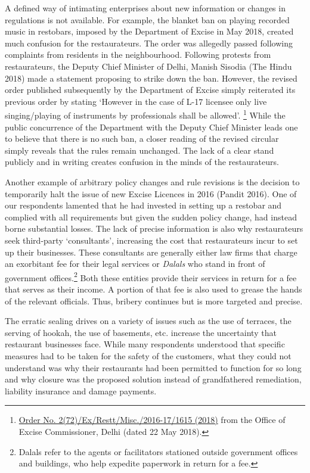 \documentclass[a4paper, 12pt]{article}
\begin{document}
		A defined way of intimating enterprises about new information or changes in regulations is not available. For example, the blanket ban on playing recorded music in restobars, imposed by the Department of Excise in May 2018, created much confusion 
for the restaurateurs. The order was allegedly passed following complaints from residents in the neighbourhood. Following protests from restaurateurs, the Deputy Chief Minister of Delhi, Manish Sisodia (The Hindu 2018) made a statement proposing to strike down 
the ban. However, the revised order published subsequently by the Department of Excise simply reiterated its previous order by stating ‘However in the case of L-17 licensee only live singing/playing of instruments by professionals shall be allowed’.
\footnote{\href{https://bit.ly/2QxMK56}{Order No. 2(72)/Ex/Restt/Misc./2016-17/1615 (2018)} from the Office of Excise Commissioner, Delhi (dated 22 May 2018).}  While the public concurrence of the Department with the Deputy Chief Minister leads one to believe 
that there is no such ban, a closer reading of the revised circular simply reveals that the rules remain unchanged. The lack of a clear stand publicly and in writing creates confusion in the minds of the restaurateurs.
		
		Another example of arbitrary policy changes and rule revisions is the decision to temporarily halt the issue of new Excise Licences in 2016 (Pandit 2016). One of our respondents lamented that he had invested in setting up a restobar and complied with 
all requirements but given the sudden policy change, had instead borne substantial losses. The lack of precise information is also why restaurateurs seek third-party ‘consultants’, increasing the cost that restaurateurs incur to set up their businesses. These 
consultants are generally either law firms that charge an exorbitant fee for their legal services or \textit{Dalals} who stand in front of government offices.\footnote{Dalals refer to the agents or facilitators stationed outside government offices and buildings, who help 
expedite paperwork in return for a fee.} Both these entities provide their services in return for a fee that serves as their income. A portion of that fee is also used to grease the hands of the relevant officials. Thus, bribery continues but is more targeted and precise.
		
		The erratic sealing drives on a variety of issues such as the use of terraces, the serving of hookah, the use of basements, etc. increase the uncertainty that restaurant businesses face. While many respondents understood that specific measures had to 
be taken for the safety of the customers, what they could not understand was why their restaurants had been permitted to function for so long and why closure was the proposed solution instead of grandfathered remediation, liability insurance and damage 
payments.
\end{document}
